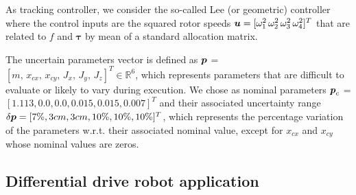 As tracking controller, we consider the so-called Lee (or geometric) controller~\cite{cLee} where the control inputs are the squared rotor speeds $\boldsymbol{u} = [\omega_{1}^2 \, \omega_{2}^2 \, \omega_{3}^2 \, \omega_{4}^2]^T$ that are related to $f$ and $\boldsymbol{\tau}$ by mean of a standard allocation matrix.

The uncertain parameters vector is defined as
$\boldsymbol{p}$ = $[m, \, x_{cx}, \, x_{cy}, \, J_{x}, \, J_{y}, \,J_{z}]^T \in \mathbb{R}^{6}$, which represents parameters that are difficult to evaluate or likely to vary during execution. 
We chose as nominal parameters $\boldsymbol{p}_{c}$ = $[1.113, 0.0, 0.0, 0.015, 0.015, 0.007]^T$ and their associated uncertainty range $\delta\boldsymbol{p} = [7\%, 3cm, 3cm, 10\%, 10\%, 10\%]^T$, which represents the percentage variation of the parameters w.r.t. their associated nominal value, except for $x_{cx}$ and $x_{cy}$ whose nominal values are zeros.

\subsection{Differential drive robot application}

\todomarker{}
